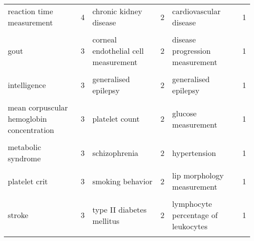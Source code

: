 \begin{landscape}
\begin{table}[p]
{\begin{tabular}[t]{lrlrlr}
reaction time measurement & 4 & chronic kidney disease & 2 & cardiovascular disease & 1\\
\cellcolor{gray!6}{eosinophil count} & \cellcolor{gray!6}{3} & \cellcolor{gray!6}{chronotype measurement} & \cellcolor{gray!6}{2} & \cellcolor{gray!6}{diastolic blood pressure} & \cellcolor{gray!6}{1}\\
gout & 3 & corneal endothelial cell measurement & 2 & disease progression measurement & 1\\
\cellcolor{gray!6}{hemoglobin measurement} & \cellcolor{gray!6}{3} & \cellcolor{gray!6}{eye colour measurement} & \cellcolor{gray!6}{2} & \cellcolor{gray!6}{erythrocyte count} & \cellcolor{gray!6}{1}\\
intelligence & 3 & generalised epilepsy & 2 & generalised epilepsy & 1\\
\cellcolor{gray!6}{low density lipoprotein cholesterol measurement} & \cellcolor{gray!6}{3} & \cellcolor{gray!6}{monocyte count} & \cellcolor{gray!6}{2} & \cellcolor{gray!6}{generalized anxiety disorder} & \cellcolor{gray!6}{1}\\
mean corpuscular hemoglobin concentration & 3 & platelet count & 2 & glucose measurement & 1\\
\cellcolor{gray!6}{mean corpuscular volume} & \cellcolor{gray!6}{3} & \cellcolor{gray!6}{response to anticonvulsant} & \cellcolor{gray!6}{2} & \cellcolor{gray!6}{hemoglobin measurement} & \cellcolor{gray!6}{1}\\
metabolic syndrome & 3 & schizophrenia & 2 & hypertension & 1\\
\cellcolor{gray!6}{platelet count} & \cellcolor{gray!6}{3} & \cellcolor{gray!6}{sex hormone-binding globulin measurement} & \cellcolor{gray!6}{2} & \cellcolor{gray!6}{iron biomarker measurement} & \cellcolor{gray!6}{1}\\
platelet crit & 3 & smoking behavior & 2 & lip morphology measurement & 1\\
\cellcolor{gray!6}{serum gamma-glutamyl transferase measurement} & \cellcolor{gray!6}{3} & \cellcolor{gray!6}{testosterone measurement} & \cellcolor{gray!6}{2} & \cellcolor{gray!6}{lymphocyte count} & \cellcolor{gray!6}{1}\\
stroke & 3 & type II diabetes mellitus & 2 & lymphocyte percentage of leukocytes & 1\\
\cellcolor{gray!6}{type II diabetes mellitus} & \cellcolor{gray!6}{3} & \cellcolor{gray!6}{vital capacity} & \cellcolor{gray!6}{2} & \cellcolor{gray!6}{mathematical ability} & \cellcolor{gray!6}{1}\\

\end{tabular}}
\end{table}
\end{landscape}
